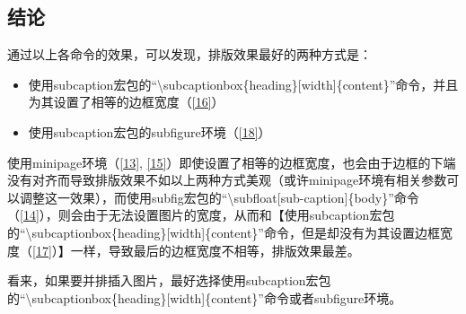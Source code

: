 \documentclass{article}
\begin{document}
\subsection{结论}
    通过以上各命令的效果，可以发现，排版效果最好的两种方式是：

    \begin{itemize}
        \item 使用subcaption宏包的``\textbackslash subcaptionbox\{heading\}[width]\{content\}''命令，并且为其设置了相等的边框宽度（\ref{16}）
        \item 使用subcaption宏包的subfigure环境（\ref{18}）
    \end{itemize}
    
    使用minipage环境（\ref{13}, \ref{15}）即使设置了相等的边框宽度，也会由于边框的下端没有对齐而导致排版效果不如以上两种方式美观（或许minipage环境有相关参数可以调整这一效果），而使用subfig宏包的``\textbackslash subfloat[sub-caption]\{body\}''命令（\ref{14}），则会由于无法设置图片的宽度，从而和【使用subcaption宏包的``\textbackslash subcaptionbox\{heading\}[width]\{content\}''命令，但是却没有为其设置边框宽度（\ref{17}）】一样，导致最后的边框宽度不相等，排版效果最差。
    
    看来，如果要并排插入图片，最好选择使用subcaption宏包的``\textbackslash subcaptionbox\{heading\}[width]\{content\}''命令或者subfigure环境。
    
\clearpage

\listoffigures
\end{document}
